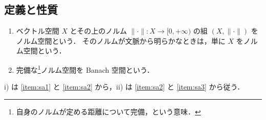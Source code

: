 \subsection{定義と性質}

\begin{definition}
    \leavevmode
    \begin{enumerate}
        \item
            ベクトル空間 $X$ とその上のノルム $\|\cdot\|:X\to[0,+\infty)$ の組 $(X,\|\cdot\|)$ をノルム空間という．
            そのノルムが文脈から明らかなときは，単に $X$ をノルム空間という．
        \item
            完備な\footnote{自身のノルムが定める距離について完備，という意味．}ノルム空間を Banach 空間という．
    \end{enumerate}
\end{definition}

\begin{remark}
    \textrm{i)} は \ref{item:sa1} と \ref{item:sa2} から，\textrm{ii)} は \ref{item:sa2} と \ref{item:sa3} から従う．
\end{remark}

